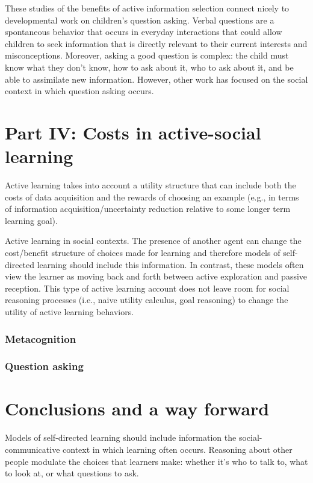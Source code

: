 \documentclass[a4paper,man,apacite,floatsintext]{apa6}
\begin{document}
These studies of the benefits of active information selection connect
nicely to developmental work on children's question asking. Verbal
questions are a spontaneous behavior that occurs in everyday
interactions that could allow children to seek information that is
directly relevant to their current interests and misconceptions.
Moreover, asking a good question is complex: the child must know what
they don't know, how to ask about it, who to ask about it, and be able
to assimilate new information. However, other work has focused on the
social context in which question asking occurs.

\section{Part IV: Costs in active-social
learning}\label{part-iv-costs-in-active-social-learning}

Active learning takes into account a utility structure that can include
both the costs of data acquisition and the rewards of choosing an
example (e.g., in terms of information acquisition/uncertainty reduction
relative to some longer term learning goal).

Active learning in social contexts. The presence of another agent can
change the cost/benefit structure of choices made for learning and
therefore models of self-directed learning should include this
information. In contrast, these models often view the learner as moving
back and forth between active exploration and passive reception. This
type of active learning account does not leave room for social reasoning
processes (i.e., naive utility calculus, goal reasoning) to change the
utility of active learning behaviors.

\subsubsection{Metacognition}\label{metacognition}

\subsubsection{Question asking}\label{question-asking}

\section{Conclusions and a way
forward}\label{conclusions-and-a-way-forward}

Models of self-directed learning should include information the
social-communicative context in which learning often occurs. Reasoning
about other people modulate the choices that learners make: whether it's
who to talk to, what to look at, or what questions to ask.
\end{document}
